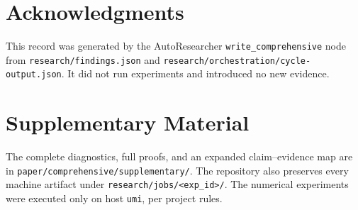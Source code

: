 \documentclass[11pt,a4paper]{article}
\newcommand{\code}[1]{\texttt{#1}}
\begin{document}
\section*{Acknowledgments}
This record was generated by the AutoResearcher \code{write\_comprehensive}
node from \code{research/findings.json} and
\code{research/orchestration/cycle-output.json}. It did not run experiments and
introduced no new evidence.

\appendix
\section{Supplementary Material}
\label{sec:supplementary}

The complete diagnostics, full proofs, and an expanded claim--evidence map are
in \code{paper/comprehensive/supplementary/}. The repository also preserves
every machine artifact under \code{research/jobs/<exp\_id>/}. The numerical
experiments were executed only on host \code{umi}, per project rules.
\end{document}

